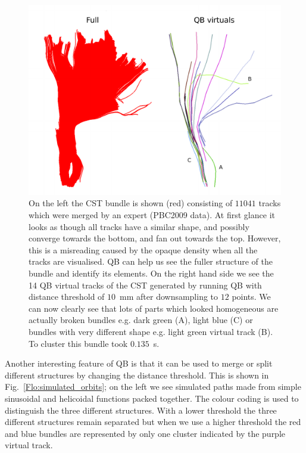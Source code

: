 \documentclass[preprint,authoryear,a4paper,10pt,onecolumn]{elsarticle}
\begin{document}
%
\begin{figure}
\begin{centering}
\includegraphics[scale=0.3]{Fig_4_cst_simplification}
\par\end{centering}
\caption{On the left the CST bundle is shown (red) consisting of $11041$
  tracks which were merged by an expert (PBC2009 data). At first glance
  it looks as though all tracks have a similar shape, and possibly
  converge towards the bottom, and fan out towards the top. However,
  this is a misreading caused by the opaque density when all the tracks
  are visualised.  QB can help us see the fuller structure of the bundle
  and identify its elements. On the right hand side we see the 14 QB
  virtual tracks of the CST generated by running QB with distance
  threshold of $10$~mm after downsampling to $12$ points. We can now
  clearly see that lots of parts which looked homogeneous are actually
  broken bundles e.g. dark green (A), light blue (C) or bundles with
  very different shape e.g. light green virtual track (B). To cluster
  this bundle took $0.135$~s.\label{Flo:cst_pbc}}
\end{figure}

Another interesting feature of QB is that it can be used to merge or
split different structures by changing the distance threshold.  This is
shown in Fig.~\ref{Flo:simulated_orbits}; on the left we see simulated
paths made from simple sinusoidal and helicoidal functions packed
together. The colour coding is used to distinguish the three different
structures. With a lower threshold the three different structures remain
separated but when we use a higher threshold the red and blue bundles
are represented by only one cluster indicated by the purple virtual
track.
\end{document}
